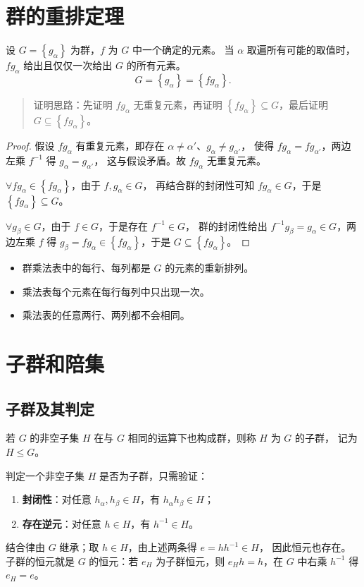 \section{群的重排定理}
\begin{theorem}[重排定理]
设 $G=\left\{g_\alpha\right\}$ 为群，$f$ 为 $G$ 中一个确定的元素。
当 $\alpha$ 取遍所有可能的取值时，$fg_\alpha$ 给出且仅仅一次给出 $G$ 的所有元素。
\begin{equation}
G=\left\{g_\alpha\right\}=\left\{fg_\alpha\right\}.
\end{equation}
\end{theorem}
\begin{quote}
证明思路：先证明 $fg_\alpha$ 无重复元素，再证明
$\left\{fg_\alpha\right\}\subseteq G$，最后证明 $G\subseteq\left\{fg_\alpha\right\}$。
\end{quote}
\begin{proof}
假设 $fg_\alpha$ 有重复元素，即存在 $\alpha\ne\alpha'$、$g_\alpha\ne g_{\alpha'}$，
使得 $fg_\alpha=fg_{\alpha'}$，两边左乘 $f^{-1}$ 得 $g_\alpha=g_{\alpha'}$，
这与假设矛盾。故 $fg_\alpha$ 无重复元素。

$\forall fg_\alpha\in\left\{fg_\alpha\right\}$，由于 $f,g_\alpha\in G$，
再结合群的封闭性可知 $fg_\alpha\in G$，于是 $\left\{fg_\alpha\right\}\subseteq G$。

$\forall g_\beta\in G$，由于 $f\in G$，于是存在 $f^{-1}\in G$，
群的封闭性给出 $f^{-1}g_\beta=g_\alpha\in G$，两边左乘 $f$ 得
$g_\beta=fg_\alpha\in\left\{fg_\alpha\right\}$，于是 $G\subseteq\left\{fg_\alpha\right\}$。
\end{proof}

\begin{itemize}
\item 群乘法表中的每行、每列都是 $G$ 的元素的重新排列。
\item 乘法表每个元素在每行每列中只出现一次。
\item 乘法表的任意两行、两列都不会相同。
\end{itemize}

\section{子群和陪集}
\subsection{子群及其判定}
\begin{definition}[子群]
若 $G$ 的非空子集 $H$ 在与 $G$ 相同的运算下也构成群，则称 $H$ 为 $G$ 的子群，
记为 $H\leq G$。
\end{definition}
判定一个非空子集 $H$ 是否为子群，只需验证：
\begin{enumerate}
\item \textbf{封闭性}：对任意 $h_\alpha,h_\beta\in H$，有 $h_\alpha h_\beta\in H$；
\item \textbf{存在逆元}：对任意 $h\in H$，有 $h^{-1}\in H$。
\end{enumerate}
结合律由 $G$ 继承；取 $h\in H$，由上述两条得 $e=hh^{-1}\in H$，
因此恒元也存在。子群的恒元就是 $G$ 的恒元：若 $e_H$ 为子群恒元，则
$e_Hh=h$，在 $G$ 中右乘 $h^{-1}$ 得 $e_H=e$。

